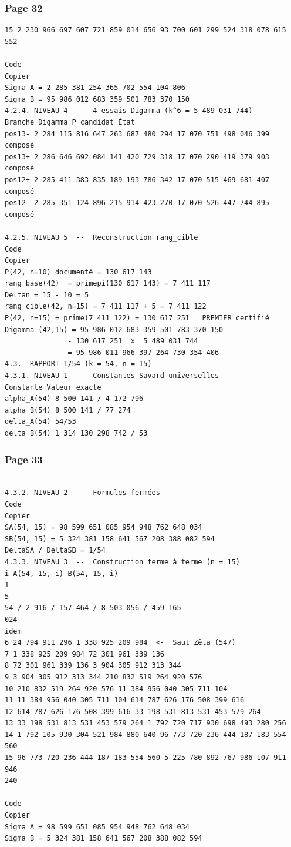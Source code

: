 \documentclass[11pt,a4paper]{article}
\begin{document}
\subsubsection*{Page 32}
\begin{Verbatim}[fontsize=\footnotesize]
15 2 230 966 697 607 721 859 014 656 93 700 601 299 524 318 078 615 552 
 
Code 
Copier 
Sigma A = 2 285 381 254 365 702 554 104 806   
Sigma B = 95 986 012 683 359 501 783 370 150   
4.2.4. NIVEAU 4  --  4 essais Digamma (k^6 = 5 489 031 744) 
Branche Digamma P candidat État 
pos13- 2 284 115 816 647 263 687 480 294 17 070 751 498 046 399   composé 
pos13+ 2 286 646 692 084 141 420 729 318 17 070 290 419 379 903   composé 
pos12+ 2 285 411 383 835 189 193 786 342 17 070 515 469 681 407   composé 
pos12- 2 285 351 124 896 215 914 423 270 17 070 526 447 744 895   composé 
 
4.2.5. NIVEAU 5  --  Reconstruction rang_cible 
Code 
Copier 
P(42, n=10) documenté = 130 617 143 
rang_base(42)  = primepi(130 617 143) = 7 411 117 
Deltan = 15 - 10 = 5 
rang_cible(42, n=15) = 7 411 117 + 5 = 7 411 122 
P(42, n=15) = prime(7 411 122) = 130 617 251   PREMIER certifié 
Digamma (42,15) = 95 986 012 683 359 501 783 370 150 
               - 130 617 251  x  5 489 031 744 
               = 95 986 011 966 397 264 730 354 406 
4.3.  RAPPORT 1/54 (k = 54, n = 15) 
4.3.1. NIVEAU 1  --  Constantes Savard universelles 
Constante Valeur exacte 
alpha_A(54) 8 500 141 / 4 172 796 
alpha_B(54) 8 500 141 / 77 274 
delta_A(54) 54/53 
delta_B(54) 1 314 130 298 742 / 53 
\end{Verbatim}
\medskip
\subsubsection*{Page 33}
\begin{Verbatim}[fontsize=\footnotesize]
 
4.3.2. NIVEAU 2  --  Formules fermées 
Code 
Copier 
SA(54, 15) = 98 599 651 085 954 948 762 648 034 
SB(54, 15) = 5 324 381 158 641 567 208 388 082 594 
DeltaSA / DeltaSB = 1/54   
4.3.3. NIVEAU 3  --  Construction terme à terme (n = 15) 
i A(54, 15, i) B(54, 15, i) 
1-
5 
54 / 2 916 / 157 464 / 8 503 056 / 459 165 
024 
idem 
6 24 794 911 296 1 338 925 209 984  <-  Saut Zêta (547) 
7 1 338 925 209 984 72 301 961 339 136 
8 72 301 961 339 136 3 904 305 912 313 344 
9 3 904 305 912 313 344 210 832 519 264 920 576 
10 210 832 519 264 920 576 11 384 956 040 305 711 104 
11 11 384 956 040 305 711 104 614 787 626 176 508 399 616 
12 614 787 626 176 508 399 616 33 198 531 813 531 453 579 264 
13 33 198 531 813 531 453 579 264 1 792 720 717 930 698 493 280 256 
14 1 792 105 930 304 521 984 880 640 96 773 720 236 444 187 183 554 560 
15 96 773 720 236 444 187 183 554 560 5 225 780 892 767 986 107 911 946 
240 
 
Code 
Copier 
Sigma A = 98 599 651 085 954 948 762 648 034   
Sigma B = 5 324 381 158 641 567 208 388 082 594   
\end{Verbatim}
\medskip
\end{document}
